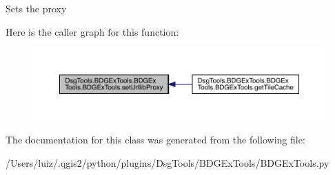 \begin{DoxyVerb}Sets the proxy
\end{DoxyVerb}
 Here is the caller graph for this function\+:
\nopagebreak
\begin{figure}[H]
\begin{center}
\leavevmode
\includegraphics[width=350pt]{class_dsg_tools_1_1_b_d_g_ex_tools_1_1_b_d_g_ex_tools_1_1_b_d_g_ex_tools_a4aa1b6400c85244c9e1e58f2db6dd5b0_icgraph}
\end{center}
\end{figure}


The documentation for this class was generated from the following file\+:\begin{DoxyCompactItemize}
\item 
/\+Users/luiz/.\+qgis2/python/plugins/\+Dsg\+Tools/\+B\+D\+G\+Ex\+Tools/B\+D\+G\+Ex\+Tools.\+py\end{DoxyCompactItemize}
